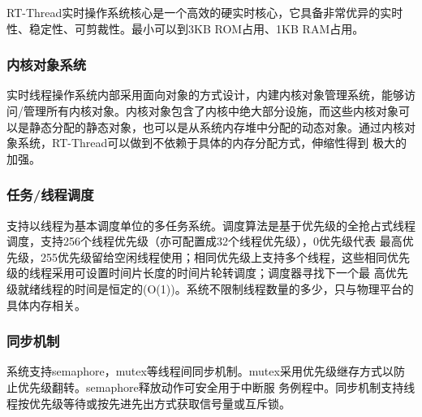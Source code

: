 RT-Thread实{\cf}时操{\cf}作系{\cf}统核{\cf}心是{\cf}一个{\cf}高效{\cf}的硬{\cf}实时{\cf}核心{\cf}，它{\cf}具备{\cf}非常{\cf}优异{\cf}的实{\cf}时性{\cf}、稳{\cf}定性{\cf}、可{\cf}剪裁{\cf}性。{\cf}最小{\cf}可以{\cf}到3{\cf}KB{\cf} R{\cf}OM{\cf}占用{\cf}、1{\cf}KB{\cf} R{\cf}AM{\cf}占用。

\subsubsection{内核对象系统}
实{\cf}时线{\cf}程操{\cf}作系{\cf}统内{\cf}部采{\cf}用面{\cf}向对{\cf}象的{\cf}方式{\cf}设计{\cf}，内{\cf}建内{\cf}核对{\cf}象管{\cf}理系{\cf}统，{\cf}能够{\cf}访问{\cf}/管{\cf}理所{\cf}有内{\cf}核对{\cf}象。{\cf}内核{\cf}对象{\cf}包含{\cf}了内{\cf}核中{\cf}绝大{\cf}部分{\cf}设施{\cf}，而{\cf}这些{\cf}内核{\cf}对象{\cf}可 {\cf}以是{\cf}静态{\cf}分配{\cf}的静{\cf}态对{\cf}象，{\cf}也可{\cf}以是{\cf}从系{\cf}统内{\cf}存堆{\cf}中分{\cf}配的{\cf}动态{\cf}对象{\cf}。通{\cf}过内{\cf}核对{\cf}象系{\cf}统，{\cf}RT{\cf}-T{\cf}hr{\cf}ea{\cf}d可{\cf}以做{\cf}到不{\cf}依赖{\cf}于具{\cf}体的{\cf}内存{\cf}分配{\cf}方式{\cf}，伸{\cf}缩性{\cf}得到{\cf} 极{\cf}大的{\cf}加强。

\subsubsection{任务/线程调度}
支{\cf}持以{\cf}线程{\cf}为基{\cf}本调{\cf}度单{\cf}位的{\cf}多任{\cf}务系{\cf}统。{\cf}调度{\cf}算法{\cf}是基{\cf}于优{\cf}先级{\cf}的全{\cf}抢占{\cf}式线{\cf}程调{\cf}度，{\cf}支持{\cf}25{\cf}6个{\cf}线程{\cf}优先{\cf}级（{\cf}亦可{\cf}配置{\cf}成3{\cf}2个{\cf}线程{\cf}优先{\cf}级）{\cf}，0{\cf}优先{\cf}级代{\cf}表 {\cf}最高{\cf}优先{\cf}级，{\cf}25{\cf}5优{\cf}先级{\cf}留给{\cf}空闲{\cf}线程{\cf}使用{\cf}；相{\cf}同优{\cf}先级{\cf}上支{\cf}持多{\cf}个线{\cf}程，{\cf}这些{\cf}相同{\cf}优先{\cf}级的{\cf}线程{\cf}采用{\cf}可设{\cf}置时{\cf}间片{\cf}长度{\cf}的时{\cf}间片{\cf}轮转{\cf}调度{\cf}；调{\cf}度器{\cf}寻找{\cf}下一{\cf}个最{\cf} 高{\cf}优先{\cf}级就{\cf}绪线{\cf}程的{\cf}时间{\cf}是恒{\cf}定的{\cf}(O{\cf}(1{\cf})){\cf}。系{\cf}统不{\cf}限制{\cf}线程{\cf}数量{\cf}的多{\cf}少，{\cf}只与{\cf}物理{\cf}平台{\cf}的具{\cf}体内{\cf}存相关。

\subsubsection{同步机制}
系{\cf}统支{\cf}持s{\cf}em{\cf}ap{\cf}ho{\cf}re{\cf}，m{\cf}ut{\cf}ex{\cf}等线{\cf}程间{\cf}同步{\cf}机制{\cf}。m{\cf}ut{\cf}ex{\cf}采用{\cf}优先{\cf}级继{\cf}存方{\cf}式以{\cf}防止{\cf}优先{\cf}级翻{\cf}转。{\cf}se{\cf}ma{\cf}ph{\cf}or{\cf}e释{\cf}放动{\cf}作可{\cf}安全{\cf}用于{\cf}中断{\cf}服 {\cf}务例{\cf}程中{\cf}。同{\cf}步机{\cf}制支{\cf}持线{\cf}程按{\cf}优先{\cf}级等{\cf}待或{\cf}按先{\cf}进先{\cf}出方{\cf}式获{\cf}取信{\cf}号量{\cf}或互{\cf}斥锁。

